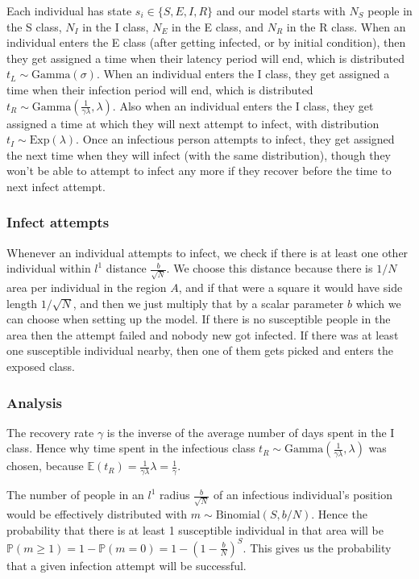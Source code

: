 \documentclass[11pt]{article}
\begin{document}
Each individual has state $s_i\in \{S,E,I,R\}$ and our model starts with $N_S$ people in the S class, $N_I$ in the I class, $N_E$ in the E class, and $N_R$ in the R class. When an individual enters the E class (after getting infected, or by initial condition), then they get assigned a time when their latency period will end, which is distributed $t_L \sim \text{Gamma}(\sigma)$. When an individual enters the I class, they get assigned a time when their infection period will end, which is distributed $t_R \sim \text{Gamma}(\frac{1}{\gamma\lambda}, \lambda)$. Also when an individual enters the I class, they get assigned a time at which they will next attempt to infect, with distribution $t_I\sim \text{Exp}(\lambda)$. Once an infectious person attempts to infect, they get assigned the next time when they will infect (with the same distribution), though they won't be able to attempt to infect any more if they recover before the time to next infect attempt.
\subsubsection*{Infect attempts}
Whenever an individual attempts to infect, we check if there is at least one other individual within $l^1$ distance $\frac{b}{\sqrt{N}}$. We choose this distance because there is $1/N$ area per individual in the region $A$, and if that were a square it would have side length $1/\sqrt{N}$, and then we just multiply that by a scalar parameter $b$ which we can choose when setting up the model. If there is no susceptible people in the area then the attempt failed and nobody new got infected. If there was at least one susceptible individual nearby, then one of them gets picked and enters the exposed class.

\subsubsection*{Analysis}
The recovery rate $\gamma$ is the inverse of the average number of days spent in the I class. Hence why time spent in the infectious class $t_R \sim \text{Gamma}(\frac{1}{\gamma\lambda}, \lambda)$ was chosen, because $\mathbb{E}(t_R)=\frac{1}{\gamma\lambda} \lambda=\frac{1}{\gamma}$.

The number of people in an $l^1$ radius $\frac{b}{\sqrt{N}}$ of an infectious individual's position would be effectively distributed with $m\sim \text{Binomial}(S,b/N)$. Hence the probability that there is at least 1 susceptible individual in that area will be $\mathbb{P}(m\geq 1) = 1-\mathbb{P}(m=0) = 1-(1-\frac{b}{N})^S$. This gives us the probability that a given infection attempt will be successful.
\end{document}
